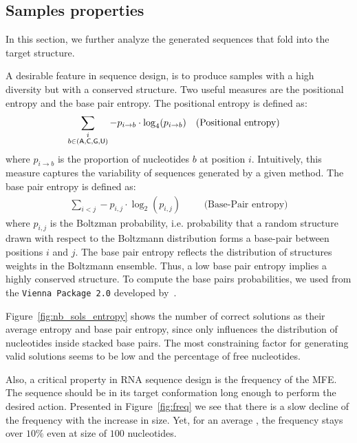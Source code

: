 \subsection{Samples properties}

In this section, we further analyze the generated sequences that fold into the 
target structure. 

A desirable feature in sequence design, is to produce samples with a high
diversity but with a conserved structure.
Two useful measures are the positional entropy and the base pair entropy.
The positional entropy is defined as:
\begin{align}
  \sum_{\substack{i\\b \in ({\sf{A}},{\sf{C}},{\sf{G}},{\sf{U}})}} -p_{i\to b}\cdot \log_4(p_{i\to b}) &&& \text{(Positional entropy)}
  \label{eq:entropy}
\end{align}
where $p_{i\to b}$ is the proportion of nucleotides $b$ at position $i$.
Intuitively, this measure captures the variability of sequences generated by a given method.
The base pair entropy is defined as:
\begin{align}
  \sum_{i<j}-p_{i,j}\cdot \log_2(p_{i,j})&&& \text{(Base-Pair entropy)}
  \label{eq:bpentropy}
\end{align}
where $p_{i,j}$ is the Boltzman probability, i.e. probability that a random structure drawn with respect to 
the Boltzmann distribution forms a base-pair between positions $i$ and $j$. The base pair entropy reflects
the distribution of structures weights in the Boltzmann ensemble. Thus, a low base pair entropy implies a highly conserved structure.
To compute the base pairs probabilities, we used \rnafold from the \texttt{Vienna Package 2.0} developed by~\cite{Hofacker:1994}.

  Figure~\ref{fig:nb_sols_entropy} shows the number of correct
solutions as their average entropy and base pair entropy, since 
\ourprog  only influences the distribution of nucleotides inside 
stacked base pairs. The most constraining factor for generating valid
 solutions seems to be  low \GCContent and the percentage of free nucleotides. 


Also, a critical property in RNA sequence design is 
the frequency of the MFE. 
The sequence should be in its target conformation long enough to
perform the desired action. Presented in Figure~\ref{fig:freq} we see that
there is a slow decline of the frequency with the increase in size. Yet,
for an average \GCContent, the frequency stays over $10\%$ even
at size of $100$ nucleotides.


